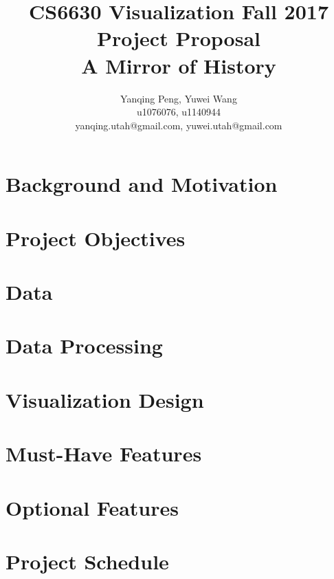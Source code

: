 \documentclass{article}
\title{CS6630 Visualization Fall 2017 Project Proposal\\ A Mirror of History}
\author{Yanqing Peng, Yuwei Wang \\ u1076076, u1140944 \\ yanqing.utah@gmail.com, yuwei.utah@gmail.com}
\begin{document}
\maketitle
\section{Background and Motivation}
\section{Project Objectives}
\section{Data}
\section{Data Processing}
\section{Visualization Design}
\section{Must-Have Features}
\section{Optional Features}
\section{Project Schedule}
\end{document}
